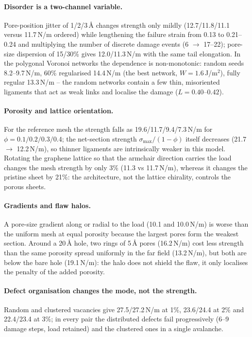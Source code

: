 \paragraph{Disorder is a two-channel variable.} Pore-position jitter of 1/2/3\,\AA{} changes strength only mildly (12.7/11.8/11.1 versus 11.7\,N/m ordered) while lengthening the failure strain from 0.13 to 0.21--0.24 and multiplying the number of discrete damage events (6 $\to$ 17--22); pore-size dispersion of 15/30\% gives 12.0/11.3\,N/m with the same tail elongation. In the polygonal Voronoi networks the dependence is non-monotonic: random seeds 8.2--9.7\,N/m, 60\% regularised 14.4\,N/m (the best network, $W=1.6$\,J/m$^2$), fully regular 13.3\,N/m -- the random networks contain a few thin, misoriented ligaments that act as weak links and localise the damage ($L=0.40$--$0.42$).

\paragraph{Porosity and lattice orientation.} For the reference mesh the strength falls as 19.6/11.7/9.4/7.3\,N/m for $\phi=0.1/0.2/0.3/0.4$; the net-section strength $\sigma_\mathrm{max}/(1-\phi)$ itself decreases (21.7 $\to$ 12.2\,N/m), so thinner ligaments are intrinsically weaker in this model. Rotating the graphene lattice so that the armchair direction carries the load changes the mesh strength by only 3\% (11.3 vs 11.7\,N/m), whereas it changes the pristine sheet by 21\%: the architecture, not the lattice chirality, controls the porous sheets.

\paragraph{Gradients and flaw halos.} A pore-size gradient along or radial to the load (10.1 and 10.0\,N/m) is worse than the uniform mesh at equal porosity because the largest pores form the weakest section. Around a 20\,\AA{} hole, two rings of 5\,\AA{} pores (16.2\,N/m) cost less strength than the same porosity spread uniformly in the far field (13.2\,N/m), but both are below the bare hole (19.1\,N/m): the halo does not shield the flaw, it only localises the penalty of the added porosity.

\paragraph{Defect organisation changes the mode, not the strength.} Random and clustered vacancies give 27.5/27.2\,N/m at 1\%, 23.6/24.4 at 2\% and 22.4/23.4 at 3\%; in every pair the distributed defects fail progressively (6--9 damage steps, load retained) and the clustered ones in a single avalanche.

